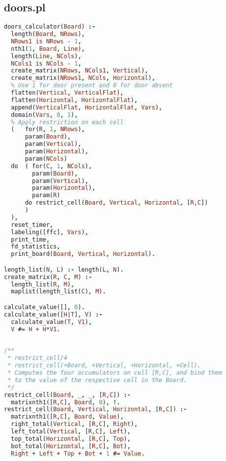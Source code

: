 \documentclass[runningheads]{llncs}
\begin{document}
\subsection{doors.pl}

\begin{center}
\begin{minipage}{0.85\textwidth}
\centering\ttfamily
\begin{lstlisting}[language=Prolog]
doors_calculator(Board) :-
  length(Board, NRows),
  NRows1 is NRows - 1,
  nth1(1, Board, Line),
  length(Line, NCols),
  NCols1 is NCols - 1,
  create_matrix(NRows, NCols1, Vertical),
  create_matrix(NRows1, NCols, Horizontal),
  % Use 1 for door present and 0 for door absent
  flatten(Vertical, VerticalFlat),
  flatten(Horizontal, HorizontalFlat),
  append(VerticalFlat, HorizontalFlat, Vars),
  domain(Vars, 0, 1),
  % Apply restriction on each cell
  (   for(R, 1, NRows),
      param(Board),
      param(Vertical),
      param(Horizontal),
      param(NCols)
  do  ( for(C, 1, NCols),
        param(Board),
        param(Vertical),
        param(Horizontal),
        param(R)
      do restrict_cell(Board, Vertical, Horizontal, [R,C])
      )
  ),
  reset_timer,
  labeling([ffc], Vars),
  print_time,
  fd_statistics,
  print_board(Board, Vertical, Horizontal).

length_list(N, L) :- length(L, N).
create_matrix(R, C, M) :-
  length_list(R, M),
  maplist(length_list(C), M).

calculate_value([], 0).
calculate_value([H|T], V) :-
  calculate_value(T, V1),
  V #= H + H*V1.
  
\end{lstlisting}
\end{minipage}
\end{center}

\begin{center}
\begin{minipage}{0.85\textwidth}
\centering\ttfamily
\begin{lstlisting}[language=Prolog]
/**
 * restrict_cell/4
 * restrict_cell(+Board, +Vertical, +Horizontal, +Cell).
 * Computes the four accumulators on cell [R,C], and bind them
 * to the value of the respective cell in the Board.
 */
restrict_cell(Board, _, _, [R,C]) :-
  matrixnth1([R,C], Board, 0), !.
restrict_cell(Board, Vertical, Horizontal, [R,C]) :-
  matrixnth1([R,C], Board, Value),
  right_total(Vertical, [R,C], Right),
  left_total(Vertical, [R,C], Left),
  top_total(Horizontal, [R,C], Top),
  bot_total(Horizontal, [R,C], Bot),
  Right + Left + Top + Bot + 1 #= Value.
  
\end{lstlisting}
\end{minipage}
\end{center}
\end{document}
